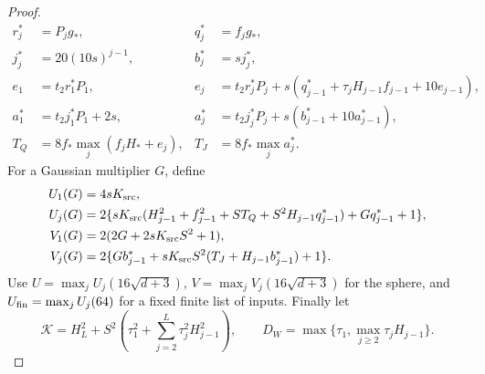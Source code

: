 \begin{proof}
\begin{align}
 r_j^*&=P_jg_*,&q_j^*&=f_jg_*,\nonumber\\
 j_j^*&=20(10s)^{j-1},&b_j^*&=sj_j^*,\nonumber\\
 e_1&=t_2r_1^*P_1,&
 e_j&=t_2r_j^*P_j+s(q_{j-1}^*+\tau_jH_{j-1}f_{j-1}+10e_{j-1}),\nonumber\\
 a_1^*&=t_2j_1^*P_1+2s,&
 a_j^*&=t_2j_j^*P_j+s(b_{j-1}^*+10a_{j-1}^*),\nonumber\\
 T_Q&=8f_*\max_j(f_jH_*+e_j),&T_J&=8f_*\max_ja_j^*.
 \label{cp:src-response-coefficients}
\end{align}
For a Gaussian multiplier \(G\), define
\begin{align}
 U_1(G)&=4sK_{\rm src},\nonumber\\
 U_j(G)&=2\{sK_{\rm src}(H_{j-1}^2+f_{j-1}^2+ST_Q
                  +S^2H_{j-1}q_{j-1}^*)+Gq_{j-1}^*+1\},\nonumber\\
 V_1(G)&=2(2G+2sK_{\rm src}S^2+1),\nonumber\\
 V_j(G)&=2\{Gb_{j-1}^*+sK_{\rm src}S^2
                    (T_J+H_{j-1}b_{j-1}^*)+1\}. \label{cp:src-UV}
\end{align}
Use \(U=\max_jU_j(16\sqrt{d+3})\),
\(V=\max_jV_j(16\sqrt{d+3})\) for the sphere, and
\(U_{\rm fin}=\max_jU_j(64)\) for a fixed finite list of inputs.
Finally let
\begin{equation}
 \mathcal K=H_L^2+S^2\left(\tau_1^2+
            \sum_{j=2}^L\tau_j^2H_{j-1}^2\right),\qquad
 D_W=\max\{\tau_1,\max_{j\ge2}\tau_jH_{j-1}\}.
 \label{cp:src-K}
\end{equation}


\end{proof}
